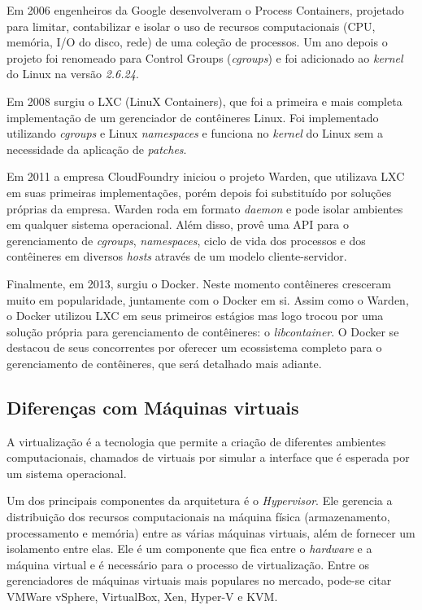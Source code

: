     	Em 2006 engenheiros da Google desenvolveram o Process Containers, projetado para limitar, contabilizar e isolar o uso de recursos computacionais (CPU, memória, I/O do disco, rede) de uma coleção de processos. Um ano depois o projeto foi renomeado para Control Groups (\textit{cgroups}) e foi adicionado ao \textit{kernel} do Linux na versão \textit{2.6.24}.

    	Em 2008 surgiu o LXC (LinuX Containers), que foi a primeira e mais completa implementação de um gerenciador de contêineres Linux. Foi implementado utilizando \textit{cgroups} e Linux \textit{namespaces} e funciona no \textit{kernel} do Linux sem a necessidade da aplicação de \textit{patches}.
	
    	Em 2011 a empresa CloudFoundry iniciou o projeto Warden, que utilizava LXC em suas primeiras implementações, porém depois foi substituído por soluções próprias da empresa. Warden roda em formato \textit{daemon} e pode isolar ambientes em qualquer sistema operacional. Além disso, provê uma API para o gerenciamento de \textit{cgroups}, \textit{namespaces}, ciclo de vida dos processos e dos contêineres em diversos \textit{hosts} através de um modelo cliente-servidor.

    	Finalmente, em 2013, surgiu o Docker. Neste momento contêineres cresceram muito em popularidade, juntamente com o Docker em si.
	    Assim como o Warden, o Docker utilizou LXC em seus primeiros estágios mas logo trocou por uma solução própria para gerenciamento de     contêineres: o \textit{libcontainer}.
	    O Docker se destacou de seus concorrentes por oferecer um ecossistema completo para o gerenciamento de contêineres, que será detalhado mais adiante.
	
	\subsection{Diferenças com Máquinas virtuais}
	
	A virtualização é a tecnologia que permite a criação de diferentes ambientes computacionais, chamados de virtuais por simular a interface que é esperada por um sistema operacional.
	
	Um dos principais componentes da arquitetura é o \textit{Hypervisor}. Ele gerencia a distribuição dos recursos computacionais na máquina física (armazenamento, processamento e memória) entre as várias máquinas virtuais, além de fornecer um isolamento entre elas. Ele é um componente que fica entre o \textit{hardware} e a máquina virtual e é necessário para o processo de virtualização.
	Entre os gerenciadores de máquinas virtuais mais populares no mercado, pode-se citar VMWare vSphere, VirtualBox, Xen, Hyper-V e KVM.

